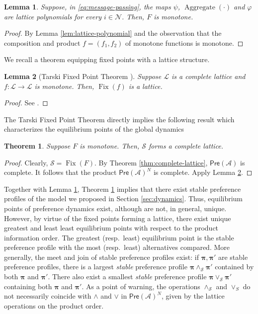 \documentclass[conference]{ieeeconf}
\newcommand{\N}{\mathcal{N}}
\newcommand{\A}{\mathcal{A}}
\renewcommand{\SS}{\mathcal{S}}
\newcommand{\Pref}{\mathsf{Pre}}
\renewcommand{\L}{\mathcal{L}}
\newcommand{\profile}{\boldsymbol{\pi}}
\newcommand{\join}{\vee}
\newcommand{\meet}{\wedge}
\newcommand{\bigjoin}{\bigvee}
\newcommand{\bigmeet}{\bigwedge}
\DeclareMathOperator{\Fix}{Fix}
\DeclareMathOperator{\Aggregate}{Aggregate}
\newtheorem{theorem}{Theorem}
\newtheorem{lemma}{Lemma}
\begin{document}
\begin{lemma} \label{lem:message-passing}
    Suppose, in \eqref{eq:message-passing}, the maps $\psi$, $\Aggregate(\cdot)$ and $\varphi$ are lattice polynomials for every $i \in \N$. Then, $F$ is monotone.
\end{lemma}
\begin{proof}
    By Lemma \ref{lem:lattice-polynomial} and the observation that the composition and product $f = (f_1,f_2)$ of monotone functions is monotone.
\end{proof}


We recall a theorem equipping fixed points with a lattice structure.
\begin{lemma}[Tarski Fixed Point Theorem \cite{tarski1955}] \label{lem:tfpt}
    Suppose $\L$ is a complete lattice and $f: \L \to \L$ is monotone. Then, $\Fix(f)$ is a lattice.
\end{lemma}
\begin{proof}
    See \cite[Theorem 12.2]{roman2008}. 
\end{proof}

The Tarski Fixed Point Theorem directly implies the following result which characterizes the equilibrium points of the global dynamics
\begin{theorem} \label{thm:dynamics}
    Suppose $F$ is monotone. Then, $\SS$ forms a complete lattice.
\end{theorem}
\begin{proof}
    Clearly, $\SS = \Fix(F)$. By Theorem \ref{thm:complete-lattice}, $\Pref(\A)$ is complete. It follows that the product $\Pref(\A)^N$ is complete. Apply Lemma \ref{lem:tfpt}.
\end{proof}

Together with Lemma \ref{lem:message-passing}, Theorem \ref{thm:dynamics} implies that there exist stable preference profiles of the model we proposed in Section \ref{sec:dynamics}. Thus, equilibrium points of preference dynamics exist, although are not, in general, unique. However, by virtue of the fixed points forming a lattice, there exist unique greatest and least least equilibrium points with respect to the product information order. The greatest (resp.~least) equilibrium point is the stable preference profile with the most (resp.~least) alternatives compared. More generally, the meet and join of stable preference profiles exist: if $\profile, \profile'$ are stable preference profiles, there is a largest \emph{stable} preference profile $\profile \meet_{\SS} \profile'$ contained by both $\profile$ and $\profile'$. There also exist a smallest \emph{stable} preference profile $\profile \join_{\SS} \profile'$ containing both $\profile$ and $\profile'$. As a point of warning, the operations $\meet_\SS$ and $\join_S$ do not necessarily coincide with $\meet$ and $\join$ in $\Pref(\A)^N$, given by the lattice operations on the product order.
\end{document}
